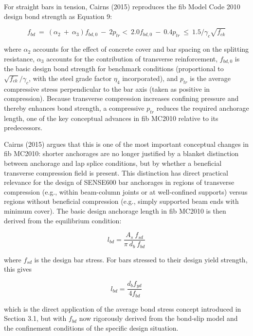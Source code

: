 For straight bars in tension, Cairns (2015) reproduces the fib Model Code 2010 design bond strength as Equation 9:

\begin{equation}
    f_{bd}\ =\ \left({\alpha }_{2}\ +\ {\alpha }_{3}\right)f_{bd,0}\ -\ 2p_{tr} <  \ 2.0f_{bd,0}\ -\ 0.4p_{tr}\ \leq \ 1.5/{\gamma }_{c} \sqrt{f_{ck}}
\end{equation}

where ${\alpha }_{2}$ accounts for the effect of concrete cover and bar spacing on the splitting resistance, ${\alpha }_{3}$ accounts for the contribution of transverse reinforcement, $f_{bd,0}$ is the basic design bond strength for benchmark conditions (proportional to $\sqrt{f_{ck}}/{\gamma }_{c}$, with the steel grade factor ${\eta }_{4}$ incorporated), and $p_{tr}$ is the average compressive stress perpendicular to the bar axis (taken as positive in compression). Because transverse compression increases confining pressure and thereby enhances bond strength, a compressive $p_{tr}$ reduces the required anchorage length, one of the key conceptual advances in fib MC2010 relative to its predecessors.

Cairns (2015) argues that this is one of the most important conceptual changes in fib MC2010: shorter anchorages are no longer justified by a blanket distinction between anchorage and lap splice conditions, but by whether a beneficial transverse compression field is present. This distinction has direct practical relevance for the design of SENSE600 bar anchorages in regions of transverse compression (e.g., within beam-column joints or at well-confined supports) versus regions without beneficial compression (e.g., simply supported beam ends with minimum cover).
The basic design anchorage length in fib MC2010 is then derived from the equilibrium condition: 

\begin{equation}
    l_{bd}=\frac{A_{s}\ f_{sd}}{\pi \ d_{b}\ f_{bd}}
\end{equation}

where $f_{sd}$ is the design bar stress. For bars stressed to their design yield strength, this gives 

\begin{equation}
    l_{bd}=\frac{d_{b}f_{yd}}{4f_{bd}}
\end{equation}

which is the direct application of the average bond stress concept introduced in Section 3.1, but with $f_{bd}$ now rigorously derived from the bond-slip model and the confinement conditions of the specific design situation.

